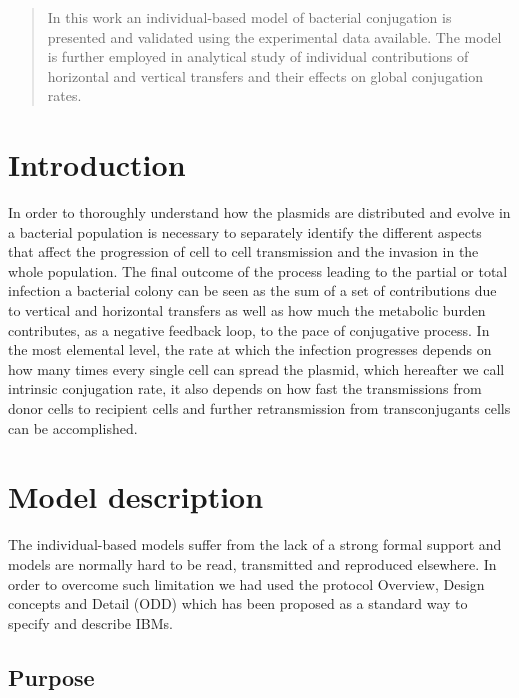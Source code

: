\begin{abstract}
In this work an individual-based model of bacterial conjugation is presented and validated using the experimental data available. The model is further employed in analytical study of individual contributions of horizontal and vertical transfers and their effects on global conjugation rates. 
\end{abstract}

\section{Introduction}

In order to thoroughly understand how the plasmids are distributed and evolve in a bacterial population is necessary to separately identify the different aspects that affect the progression of cell to cell transmission and the invasion in the whole population. The final outcome of the process leading to the partial or total infection a bacterial colony can be seen as the sum of a set of contributions due to vertical and horizontal transfers as well as how much the metabolic burden contributes, as a negative feedback loop, to the pace of conjugative process. In the most elemental level, the rate at which the infection progresses depends on how many times every single cell can spread the plasmid, which hereafter we call intrinsic conjugation rate, it also depends on how fast the transmissions from donor cells to recipient cells and further retransmission from transconjugants cells can be accomplished.


\section{Model description}

The individual-based models suffer from the lack of a strong formal support and models are normally hard to be read, transmitted and reproduced elsewhere. In order to overcome such limitation we had used the protocol Overview, Design concepts and Detail (ODD) \cite{citeulike:2285571, citeulike:7890776} which has been proposed as a standard way to specify and describe IBMs.

\subsection{Purpose}

